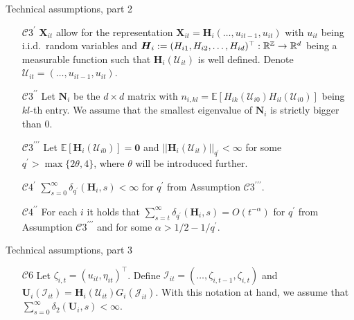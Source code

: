 \documentclass[10pt, handout]{beamer}
\newcommand{\E}{\mathbb{E}}
\newcommand{\reals}{\mathbb{R}}
\newcommand{\X}{\boldsymbol{X}}
\begin{document}
\begin{frame}[label=tech_assumptions_2]{Technical assumptions, part 2}
\begin{enumerate}

\item[$\mathcal{C}3^\prime$] $ \X_{it}$ allow for the representation $ \X_{it} = \boldsymbol{H}_i(\ldots,u_{it-1},u_{it})$ with $u_{it}$ being i.i.d.\ random variables and $\boldsymbol{H}_i := (H_{i1}, H_{i2}, \ldots, H_{id})^\top:\linebreak \mathbb{R}^\mathbb{Z} \rightarrow \reals^d$ being a measurable function such that $\boldsymbol{H}_i(\mathcal{U}_{it})$ is well defined. Denote  $\mathcal{U}_{it} = (\ldots, u_{it-1}, u_{it})$.

\item[$\mathcal{C}3^{\prime\prime}$] Let $\boldsymbol{N}_i$ be the $d\times d$ matrix with $n_{i, kl}= \E[H_{ik}(\mathcal{U}_{i0})H_{il}(\mathcal{U}_{i0})]$ being $kl$-th entry. We assume that the smallest eigenvalue of $\boldsymbol{N}_i$ is strictly bigger than $0$.

\item[$\mathcal{C}3^{\prime\prime\prime}$]  Let $\E [\mathbf{H}_{i}(\mathcal{U}_{i0})]=\mathbf{0}$ and $||\mathbf{H}_{i}(\mathcal{U}_{it})||_{q^\prime} <\infty$ for some $q^\prime > \max\{ 2\theta, 4\}$, where $\theta$ will be introduced further.
\item[$\mathcal{C}4^\prime$] $\sum_{s=0}^\infty \delta_{q^\prime}(\mathbf{H}_i, s)<\infty$ for $q^\prime$ from Assumption $\mathcal{C}3^{\prime\prime\prime}$.
\item[$\mathcal{C}4^{\prime\prime}$] For each $i$ it holds that $\sum_{s=t}^{\infty} \delta_{q^\prime}(\mathbf{H}_{i}, s)= O(t^{-\alpha}) $ for $q^\prime$ from Assumption $\mathcal{C}3^{\prime\prime\prime}$ and for some $\alpha > 1/2 - 1/{q^\prime}$. \hyperlink{frame_assumptions<5>}{}

\end{enumerate}
\end{frame}

\begin{frame}[label=tech_assumptions_3]{Technical assumptions, part 3}
\begin{enumerate}

\item[$\mathcal{C}6$] Let $\zeta_{i, t} = (u_{it}, \eta_{it})^\top$. Define $\mathcal{I}_{it} = (\ldots, \zeta_{i, t-1}, \zeta_{i, t})$ and $\mathbf{U}_i(\mathcal{I}_{it}) =  \mathbf{H}_i(\mathcal{U}_{it})G_i(\mathcal{J}_{it})$. With this notation at hand, we assume that $\sum_{s=0}^\infty \delta_2(\mathbf{U}_i, s)<\infty$.\hyperlink{frame_assumptions<7>}{}
\end{enumerate}
\end{frame}
\end{document}
